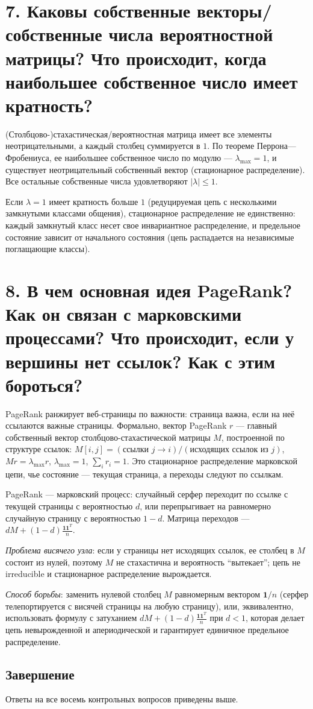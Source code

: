 \documentclass[12pt,a4paper]{article}
\begin{document}
\section*{7. Каковы собственные векторы/собственные числа вероятностной матрицы? Что происходит, когда наибольшее собственное число имеет кратность?}

(Столбцово-)стахастическая/вероятностная матрица имеет все элементы неотрицательными, а каждый столбец суммируется в $1$. По теореме Перрона---Фробениуса, ее наибольшее собственное число по модулю --- $\lambda_{\max}=1$, и существует неотрицательный собственный вектор (стационарное распределение). Все остальные собственные числа удовлетворяют $|\lambda|\le1$.

Если $\lambda=1$ имеет кратность больше $1$ (редуцируемая цепь с несколькими замкнутыми классами общения), стационарное распределение не единственно: каждый замкнутый класс несет свое инвариантное распределение, и предельное состояние зависит от начального состояния (цепь распадается на независимые поглащающие классы).

\section*{8. В чем основная идея PageRank? Как он связан с марковскими процессами? Что происходит, если у вершины нет ссылок? Как с этим бороться?}

PageRank ранжирует веб-страницы по важности: страница важна, если на неё ссылаются важные страницы. Формально, вектор PageRank $r$ --- главный собственный вектор столбцово-стахастической матрицы $M$, построенной по структуре ссылок: $M[i,j]=(\text{ссылки }j\to i)/(\text{исходящих ссылок из }j)$, $Mr=\lambda_{\max}r$, $\lambda_{\max}=1$, $\sum_i r_i=1$. Это стационарное распределение марковской цепи, чье состояние --- текущая страница, а переходы следуют по ссылкам.

PageRank --- марковский процесс: случайный серфер переходит по ссылке с текущей страницы с вероятностью $d$, или перепрыгивает на равномерно случайную страницу с вероятностью $1-d$. Матрица переходов --- $dM+(1-d)\frac{\mathbf{1}\mathbf{1}^{T}}{n}$.

\emph{Проблема висячего узла}: если у страницы нет исходящих ссылок, ее столбец в $M$ состоит из нулей, поэтому $M$ не стахастична и вероятность ``вытекает''; цепь не irreducible и стационарное распределение вырождается.

\emph{Способ борьбы}: заменить нулевой столбец $M$ равномерным вектором $\mathbf{1}/n$ (серфер телепортируется с висячей страницы на любую страницу), или, эквивалентно, использовать формулу с затуханием $dM+(1-d)\frac{\mathbf{1}\mathbf{1}^{T}}{n}$ при $d<1$, которая делает цепь невырожденной и апериодической и гарантирует единичное предельное распределение.

\subsection*{Завершение}
Ответы на все восемь контрольных вопросов приведены выше.
\end{document}
